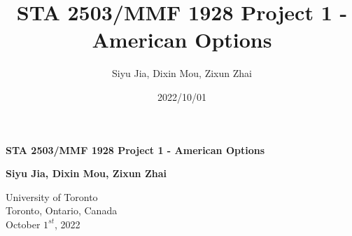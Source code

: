 \documentclass[12pt, letterpaper]{article}
\title{STA 2503/MMF 1928 Project 1 - American Options}
\author{Siyu Jia, Dixin Mou, Zixun Zhai}
\date{2022/10/01}
\begin{document}
\begin{titlepage}
  \begin{center}
      \vspace*{7cm}

      \textbf{STA 2503/MMF 1928 Project 1 - American Options}

           
      \vspace{1.5cm}

      \textbf{Siyu Jia, Dixin Mou, Zixun Zhai}

      \vfill
           
           
      \vspace{0.8cm}
           
      University of Toronto\\
      Toronto, Ontario, Canada\\
      October $1^{st}$, 2022 
           
  \end{center}
\end{titlepage}
\end{document}
